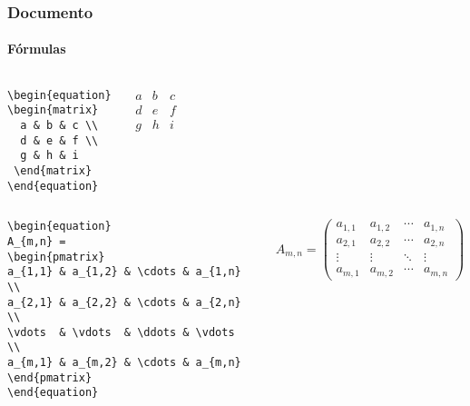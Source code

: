 \begin{frame}[fragile]
\frametitle{Documento}
\framesubtitle{Fórmulas}
  \scriptsize
  \begin{columns}[c]
  \begin{verbatim}
\begin{equation}
\begin{matrix}
  a & b & c \\
  d & e & f \\
  g & h & i
 \end{matrix}
\end{equation}
  \end{verbatim}
  \begin{fmpage}{\textwidth}
\begin{equation}
\begin{matrix}
  a & b & c \\
  d & e & f \\
  g & h & i
 \end{matrix}
\end{equation}
  \end{fmpage}
  \end{columns}

  \begin{columns}[c]
  \begin{verbatim}
\begin{equation}
A_{m,n} =
\begin{pmatrix}
a_{1,1} & a_{1,2} & \cdots & a_{1,n} \\
a_{2,1} & a_{2,2} & \cdots & a_{2,n} \\
\vdots  & \vdots  & \ddots & \vdots  \\
a_{m,1} & a_{m,2} & \cdots & a_{m,n}
\end{pmatrix}
\end{equation}
  \end{verbatim}
  \begin{fmpage}{\textwidth}
\begin{equation}
 A_{m,n} =
 \begin{pmatrix}
  a_{1,1} & a_{1,2} & \cdots & a_{1,n} \\
  a_{2,1} & a_{2,2} & \cdots & a_{2,n} \\
  \vdots  & \vdots  & \ddots & \vdots  \\
  a_{m,1} & a_{m,2} & \cdots & a_{m,n}
 \end{pmatrix}
\end{equation}
  \end{fmpage}
  \end{columns}


\end{frame}
